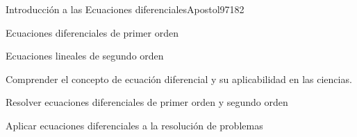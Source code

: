 \begin{syllabus}
\begin{unit}{Introducción a las Ecuaciones diferenciales}{}{Apostol97}{18}{2}
   \begin{topics}
      \item Ecuaciones diferenciales de primer orden
      \item Ecuaciones lineales de segundo orden
   \end{topics}

   \begin{learningoutcomes}
      \item Comprender el concepto de ecuación diferencial y su aplicabilidad en las ciencias.
      \item Resolver ecuaciones diferenciales de primer orden y segundo orden
      \item Aplicar ecuaciones diferenciales a la resolución de problemas
      \end{learningoutcomes}
\end{unit}

\begin{coursebibliography}
\end{coursebibliography}

\end{syllabus}
